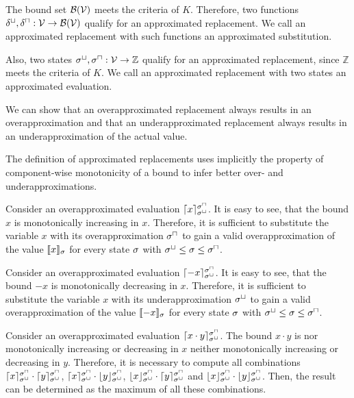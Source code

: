 The bound set $\mathcal{B}(\mathcal{V})$ meets the criteria of $K$.
Therefore, two functions $\delta^\sqcup, \delta^\sqcap: \mathcal{V} \rightarrow \mathcal{B}(\mathcal{V})$ qualify for an approximated replacement.
We call an approximated replacement with such functions an approximated substitution.

Also, two states ${\sigma^\sqcup}, {\sigma^\sqcap}: \mathcal{V} \rightarrow \mathbb{Z}$ qualify for an approximated replacement, since $\mathbb{Z}$ meets the criteria of $K$.
We call an approximated replacement with two states an approximated evaluation.

We can show that an overapproximated replacement always results in an overapproximation and that an underapproximated replacement always results in an underapproximation of the actual value.



The definition of approximated replacements uses implicitly the property of component-wise monotonicity of a bound to infer better over- and underapproximations.

Consider an overapproximated evaluation $\lceil x \rceil^{{\sigma^\sqcap}}_{{\sigma^\sqcup}}$.
It is easy to see, that the bound $x$ is monotonically increasing in $x$.
Therefore, it is sufficient to substitute the variable $x$ with its overapproximation ${\sigma^\sqcap}$ to gain a valid overapproximation of the value $\llbracket x \rrbracket_{\sigma}$ for every state $\sigma$ with ${\sigma^\sqcup} \leq \sigma \leq {\sigma^\sqcap}$.

Consider an overapproximated evaluation $\lceil -x \rceil^{{\sigma^\sqcap}}_{{\sigma^\sqcup}}$.
It is easy to see, that the bound $-x$ is monotonically decreasing in $x$.
Therefore, it is sufficient to substitute the variable $x$ with its underapproximation ${\sigma^\sqcup}$ to gain a valid overapproximation of the value $\llbracket -x \rrbracket_{\sigma}$ for every state $\sigma$ with ${\sigma^\sqcup} \leq \sigma \leq {\sigma^\sqcap}$.

Consider an overapproximated evaluation $\lceil x \cdot y \rceil^{{\sigma^\sqcap}}_{{\sigma^\sqcup}}$.
The bound $x \cdot y$ is nor monotonically increasing or decreasing in $x$ neither monotonically increasing or decreasing in $y$.
Therefore, it is necessary to compute all combinations $\lceil x \rceil^{{\sigma^\sqcap}}_{{\sigma^\sqcup}} \cdot \lceil y \rceil^{{\sigma^\sqcap}}_{{\sigma^\sqcup}}$, $\lceil x \rceil^{{\sigma^\sqcap}}_{{\sigma^\sqcup}} \cdot \lfloor y \rfloor^{{\sigma^\sqcap}}_{{\sigma^\sqcup}}$, $\lfloor x \rfloor^{{\sigma^\sqcap}}_{{\sigma^\sqcup}} \cdot \lceil y \rceil^{{\sigma^\sqcap}}_{{\sigma^\sqcup}}$ and $\lfloor x \rfloor^{{\sigma^\sqcap}}_{{\sigma^\sqcup}} \cdot \lfloor y \rfloor^{{\sigma^\sqcap}}_{{\sigma^\sqcup}}$.
Then, the result can be determined as the maximum of all these combinations.

